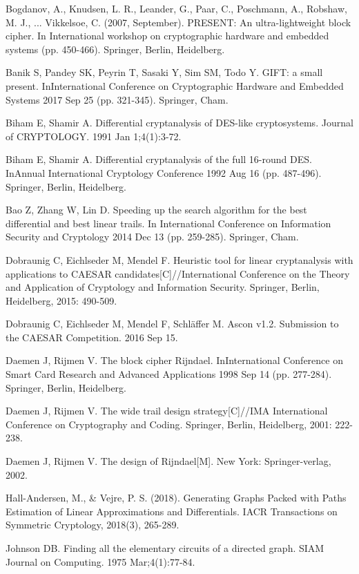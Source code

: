 \begin{thebibliography}{8}
Bogdanov, A., Knudsen, L. R., Leander, G., Paar, C., Poschmann, A., Robshaw, M. J., ...  Vikkelsoe, C. (2007, September). PRESENT: An ultra-lightweight block cipher. In International workshop on cryptographic hardware and embedded systems (pp. 450-466). Springer, Berlin, Heidelberg.

Banik S, Pandey SK, Peyrin T, Sasaki Y, Sim SM, Todo Y. GIFT: a small present. InInternational Conference on Cryptographic Hardware and Embedded Systems 2017 Sep 25 (pp. 321-345). Springer, Cham.

Biham E, Shamir A. Differential cryptanalysis of DES-like cryptosystems. Journal of CRYPTOLOGY. 1991 Jan 1;4(1):3-72.

Biham E, Shamir A. Differential cryptanalysis of the full 16-round DES. InAnnual International Cryptology Conference 1992 Aug 16 (pp. 487-496). Springer, Berlin, Heidelberg.

Bao Z, Zhang W, Lin D. Speeding up the search algorithm for the best differential and best linear trails. In International Conference on Information Security and Cryptology 2014 Dec 13 (pp. 259-285). Springer, Cham.

Dobraunig C, Eichlseder M, Mendel F. Heuristic tool for linear cryptanalysis with applications to CAESAR candidates[C]//International Conference on the Theory and Application of Cryptology and Information Security. Springer, Berlin, Heidelberg, 2015: 490-509.

Dobraunig C, Eichlseder M, Mendel F, Schläffer M. Ascon v1.2. Submission to the CAESAR Competition. 2016 Sep 15.

Daemen J, Rijmen V. The block cipher Rijndael. InInternational Conference on Smart Card Research and Advanced Applications 1998 Sep 14 (pp. 277-284). Springer, Berlin, Heidelberg.

Daemen J, Rijmen V. The wide trail design strategy[C]//IMA International Conference on Cryptography and Coding. Springer, Berlin, Heidelberg, 2001: 222-238.

Daemen J, Rijmen V. The design of Rijndael[M]. New York: Springer-verlag, 2002.

Hall-Andersen, M., \& Vejre, P. S. (2018). Generating Graphs Packed with Paths Estimation of Linear Approximations and Differentials. IACR Transactions on Symmetric Cryptology, 2018(3), 265-289.

Johnson DB. Finding all the elementary circuits of a directed graph. SIAM Journal on Computing. 1975 Mar;4(1):77-84.


\end{thebibliography}
